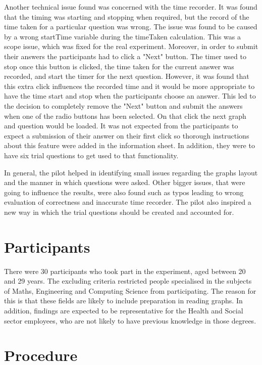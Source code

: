 \documentclass{l4proj}
\begin{document}
Another technical issue found was concerned with the time recorder. It was found that the timing was starting and stopping when required, but the record of the time taken for a particular question was wrong. The issue was found to be caused by a wrong startTime variable during the timeTaken calculation. This was a scope issue, which was fixed for the real experiment. Moreover, in order to submit their answers the participants had to click a "Next" button. The timer used to stop once this button is clicked, the time taken for the current answer was recorded, and start the timer for the next question. However, it was found that this extra click influences the recorded time and it would be more appropriate to have the time start and stop when the participants choose an answer. This led to the decision to completely remove the "Next" button and submit the answers when one of the radio buttons has been selected. On that click the next graph and question would be loaded. It was not expected from the participants to expect a submission of their answer on their first click so thorough instructions about this feature were added in the information sheet. In addition, they were to have six trial questions to get used to that functionality. 
 
In general, the pilot helped in identifying small issues regarding the graphs layout and the manner in which questions were asked. Other bigger issues, that were going to influence the results, were also found such as typos leading to wrong evaluation of correctness and inaccurate time recorder. The pilot also inspired a new way in which the trial questions should be created and accounted for.

\section{Participants}
There were 30 participants who took part in the experiment, aged between 20 and 29 years. The excluding criteria restricted people specialised in the subjects of Maths, Engineering and Computing Science from participating. The reason for this is that these fields are likely to include preparation in reading graphs. In addition, findings are expected to be representative for the Health and Social sector employees, who are not likely to have previous knowledge in those degrees.

\section{Procedure}
\end{document}
